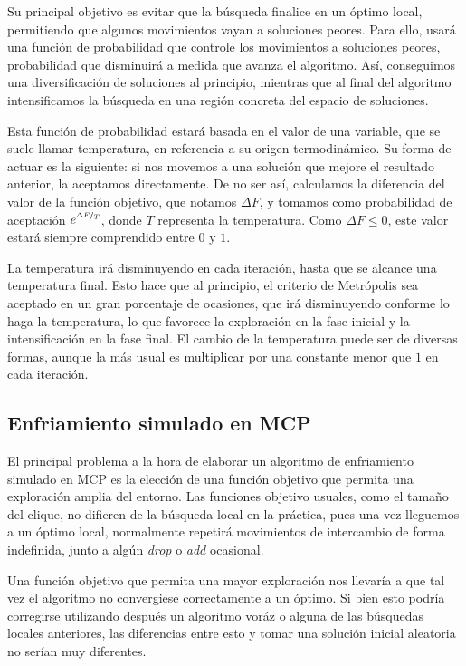 Su principal objetivo es evitar que la búsqueda finalice en un óptimo local, permitiendo que algunos
movimientos vayan a soluciones peores. Para ello, usará una función de probabilidad que controle
los movimientos a soluciones peores, probabilidad que disminuirá a medida que avanza el algoritmo.
Así, conseguimos una diversificación de soluciones al principio, mientras que al final del algoritmo
intensificamos la búsqueda en una región concreta del espacio de soluciones.

Esta función de probabilidad estará basada en el valor de una variable, que se suele llamar temperatura,
en referencia a su origen termodinámico. Su forma de actuar es la siguiente: si nos movemos a una solución
que mejore el resultado anterior, la aceptamos directamente. De no ser así, calculamos la diferencia
del valor de la función objetivo, que notamos $\Delta F$, y tomamos como probabilidad de aceptación
$e^{\nicefrac{\Delta F}{T}}$, donde $T$ representa la temperatura. Como $\Delta F \leq 0$, este valor estará
siempre comprendido entre $0$ y $1$.

La temperatura irá disminuyendo en cada iteración, hasta que se alcance una temperatura final. Esto hace
que al principio, el criterio de Metrópolis sea aceptado en un gran porcentaje de ocasiones, que irá disminuyendo
conforme lo haga la temperatura, lo que favorece la exploración en la fase inicial y la intensificación
en la fase final. El cambio de la temperatura puede ser de diversas formas, aunque la más usual es multiplicar
por una constante menor que $1$ en cada iteración.

\subsection{Enfriamiento simulado en MCP}

El principal problema a la hora de elaborar un algoritmo de enfriamiento simulado en MCP es la elección
de una función objetivo que permita una exploración amplia del entorno. Las funciones objetivo usuales,
como el tamaño del clique, no difieren de la búsqueda local en la práctica, pues una vez lleguemos a un
óptimo local, normalmente repetirá movimientos de intercambio de forma indefinida, junto a algún
\textit{drop} o \textit{add} ocasional.

Una función objetivo que permita una mayor exploración nos llevaría a que tal vez el algoritmo no
convergiese correctamente a un óptimo. Si bien esto podría corregirse utilizando después un algoritmo
voráz o alguna de las búsquedas locales anteriores, las diferencias entre esto y tomar una solución
inicial aleatoria no serían muy diferentes.

